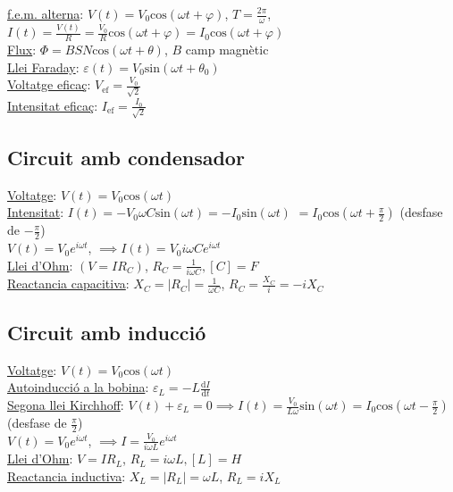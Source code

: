 \documentclass[12pt]{article}
\begin{document}
\begin{multicols}{5}
\underline{f.e.m. alterna}: $V(t) = V_0\text{cos}(\omega t+\varphi)$, $T = \frac{2\pi}{\omega}$, $I(t) = \frac{V(t)}{R} = \frac{V_0}{R}\text{cos}(\omega t + \varphi) = I_0\text{cos}(\omega t + \varphi)$ \\
\underline{Flux}: $\Phi = BSN\text{cos}(\omega t+\theta)$, $B$ camp magnètic \\
\underline{Llei Faraday}: $\varepsilon(t) = V_0\text{sin}(\omega t + \theta_0)$ \\
\underline{Voltatge eficaç}: $V_{\text{ef}} = \frac{V_0}{\sqrt{2}}$ \\
\underline{Intensitat eficaç}: $I_{\text{ef}} = \frac{I_0}{\sqrt{2}}$

\subsection{Circuit amb condensador}

\underline{Voltatge}: $V(t) = V_0\text{cos}(\omega t)$ \\
\underline{Intensitat}: $I(t) = -V_0\omega C \text{sin}(\omega t) = -I_0\text{sin}(\omega t)$ $= I_0\text{cos}(\omega t + \frac{\pi}{2})$ (desfase de $-\frac{\pi}{2}$) \\
$V(t) = V_0 e^{i\omega t}$, $\implies I(t) = V_0i\omega Ce^{i\omega t}$ \\
\underline{Llei d'Ohm}: $(V=IR_C)$, $R_C = \frac{1}{i\omega C}, [C] = F$ \\
\underline{Reactancia capacitiva}: $X_C = \vert R_C\vert = \frac{1}{\omega C}$, $R_C = \frac{X_C}{i} = -iX_C$

\subsection{Circuit amb inducció}

\underline{Voltatge}: $V(t) = V_0\text{cos}(\omega t)$ \\
\underline{Autoinducció a la bobina}: $\varepsilon_L = -L \frac{\text{d}I}{\text{d}t}$ \\
\underline{Segona llei Kirchhoff}: $V(t) + \varepsilon_L = 0 \implies I(t) = \frac{V_0}{L\omega}\text{sin}(\omega t) = I_0\text{cos}(\omega t - \frac{\pi}{2})$ (desfase de $\frac{\pi}{2}$) \\
$V(t) = V_0e^{i\omega t}$, $\implies I = \frac{V_0}{i\omega L}e^{i\omega t}$ \\
\underline{Llei d'Ohm}: $V=IR_L$, $R_L=i\omega L, [L] = H$ \\
\underline{Reactancia inductiva}: $X_L = \vert R_L\vert = \omega L$, $R_L = iX_L$


\end{multicols}
\end{document}
